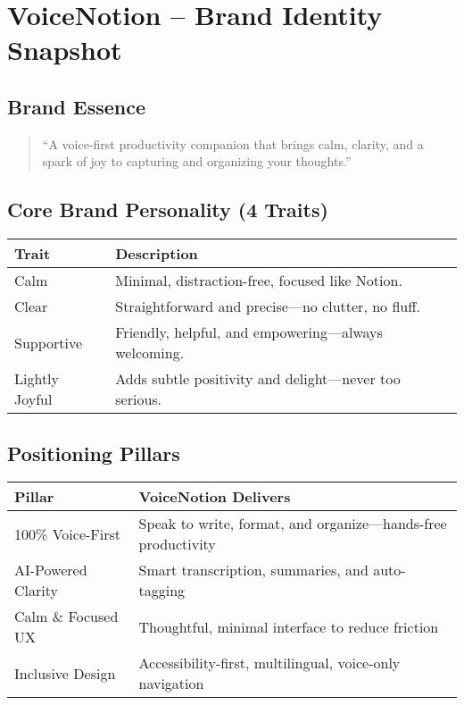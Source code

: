 \section{VoiceNotion – Brand Identity Snapshot}

\subsection{Brand Essence}
\begin{quote}
    “A voice-first productivity companion that brings calm, clarity, and a spark of joy to capturing and organizing your thoughts.”
\end{quote}

\subsection{Core Brand Personality (4 Traits)}
\begin{tabular}{|l|l|}
\hline
\textbf{Trait} & \textbf{Description} \\
\hline
Calm & Minimal, distraction-free, focused like Notion. \\
\hline
Clear & Straightforward and precise—no clutter, no fluff. \\
\hline
Supportive & Friendly, helpful, and empowering—always welcoming. \\
\hline
Lightly Joyful & Adds subtle positivity and delight—never too serious. \\
\hline
\end{tabular}

\subsection{Positioning Pillars}
\begin{tabular}{|l|l|}
\hline
\textbf{Pillar} & \textbf{VoiceNotion Delivers} \\
\hline
100\% Voice-First & Speak to write, format, and organize—hands-free productivity \\
\hline
AI-Powered Clarity & Smart transcription, summaries, and auto-tagging \\
\hline
Calm \& Focused UX & Thoughtful, minimal interface to reduce friction \\
\hline
Inclusive Design & Accessibility-first, multilingual, voice-only navigation \\
\hline
\end{tabular}

